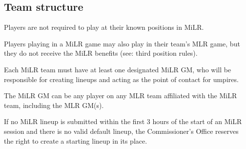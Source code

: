 \subsection{Team structure}
\begin{deepEnumerate}
	\item Players are not required to play at their known positions in MiLR.
    \item Players playing in a MiLR game may also play in their team's MLR game, but they do not receive the MiLR benefits (see: third position rules).
    \item Each MiLR team must have at least one designated MiLR GM, who will be responsible for creating lineups and acting as the point of contact for umpires.
    \begin{deepEnumerate}
        \item The MiLR GM can be any player on any MLR team affiliated with the MiLR team, including the MLR GM(s).
    \end{deepEnumerate}
    \item If no MiLR lineup is submitted within the first 3 hours of the start of an MiLR session and there is no valid default lineup, 
    the Commissioner's Office reserves the right to create a starting lineup in its place.
\end{deepEnumerate}

